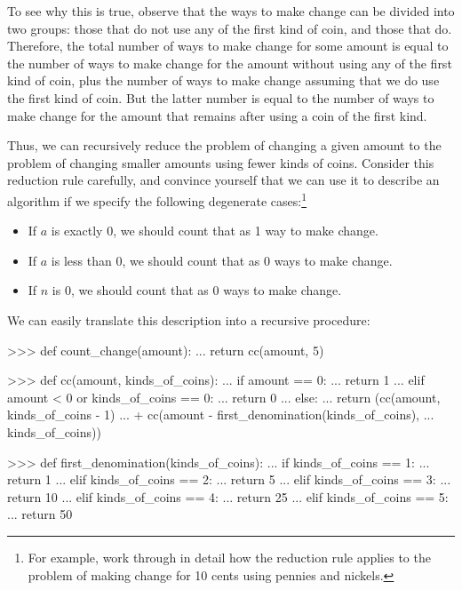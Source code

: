 \noindent
To see why this is true, observe that the ways to make change can be divided
into two groups: those that do not use any of the first kind of coin, and those
that do.  Therefore, the total number of ways to make change for some amount is
equal to the number of ways to make change for the amount without using any of
the first kind of coin, plus the number of ways to make change assuming that we
do use the first kind of coin.  But the latter number is equal to the number of
ways to make change for the amount that remains after using a coin of the first
kind.

Thus, we can recursively reduce the problem of changing a given amount to the
problem of changing smaller amounts using fewer kinds of coins.  Consider this
reduction rule carefully, and convince yourself that we can use it to describe
an algorithm if we specify the following degenerate cases:\footnote{For
example, work through in detail how the reduction rule applies to the problem
of making change for 10 cents using pennies and nickels.}

\begin{itemize}
\item
If \( a \) is exactly 0, we should count that as 1 way to make change.

\item
If \( a \) is less than 0, we should count that as 0 ways to make change.

\item
If \( n \) is 0, we should count that as 0 ways to make change.
\end{itemize}

\noindent
We can easily translate this description into a recursive procedure:

\begin{codeBlock}
>>> def count_change(amount):
...     return cc(amount, 5)

>>> def cc(amount, kinds_of_coins):
...     if amount == 0:
...         return 1
...     elif amount < 0 or kinds_of_coins == 0:
...         return 0
...     else:
...         return (cc(amount, kinds_of_coins - 1)
...                 + cc(amount - first_denomination(kinds_of_coins),
...                      kinds_of_coins))

>>> def first_denomination(kinds_of_coins):
...     if kinds_of_coins == 1:
...         return 1
...     elif kinds_of_coins == 2:
...         return 5
...     elif kinds_of_coins == 3:
...         return 10
...     elif kinds_of_coins == 4:
...         return 25
...     elif kinds_of_coins == 5:
...         return 50
\end{codeBlock}

